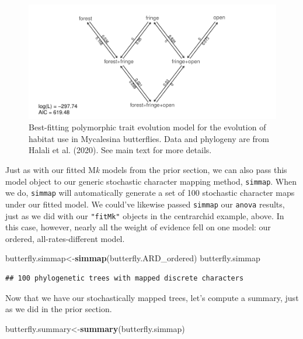 \documentclass[fleqn,10pt,lineno]{wlpeerj} %
\newenvironment{Shaded}{\begin{snugshade}}{\end{snugshade}}
\newcommand{\FunctionTok}[1]{\textcolor[rgb]{0.13,0.29,0.53}{\textbf{#1}}}
\newcommand{\NormalTok}[1]{#1}
\newcommand{\OtherTok}[1]{\textcolor[rgb]{0.56,0.35,0.01}{#1}}
\begin{document}
\begin{figure}
\includegraphics[width=1\linewidth]{Revell.phytools-v2_peerj_files/figure-latex/ordered-ard-fitpolyMk-1} \caption{Best-fitting polymorphic trait evolution model for the evolution of habitat use in Mycalesina butterflies. Data and phylogeny are from Halali et al. (2020). See main text for more details.}\label{fig:ordered-ard-fitpolyMk}
\end{figure}

Just as with our fitted M\emph{k} models from the prior section, we can also pass this model object to our generic stochastic character mapping method, \texttt{simmap}. When we do, \texttt{simmap} will automatically generate a set of 100 stochastic character maps under our fitted model. We could've likewise passed \texttt{simmap} our \texttt{anova} results, just as we did with our \texttt{"fitMk"} objects in the centrarchid example, above. In this case, however, nearly all the weight of evidence fell on one model: our ordered, all-rates-different model.

\begin{Shaded}
\begin{Highlighting}[]
\NormalTok{butterfly.simmap}\OtherTok{\textless{}{-}}\FunctionTok{simmap}\NormalTok{(butterfly.ARD\_ordered)}
\NormalTok{butterfly.simmap}
\end{Highlighting}
\end{Shaded}

\begin{verbatim}
## 100 phylogenetic trees with mapped discrete characters
\end{verbatim}

Now that we have our stochastically mapped trees, let's compute a summary, just as we did in the prior section.

\begin{Shaded}
\begin{Highlighting}[]
\NormalTok{butterfly.summary}\OtherTok{\textless{}{-}}\FunctionTok{summary}\NormalTok{(butterfly.simmap)}
\end{Highlighting}
\end{Shaded}
\end{document}
